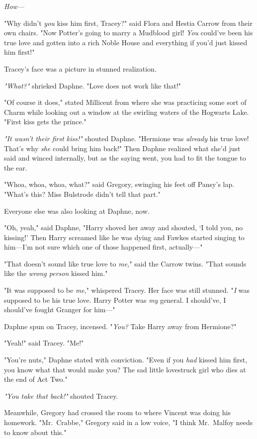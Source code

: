 \emph{How---}

"Why didn't \emph{you} kiss him first, Tracey?" said Flora and Hestia Carrow
from their own chairs. "Now Potter's going to marry a Mudblood girl! \emph{You}
could've been his true love and gotten into a rich Noble House and everything
if you'd just kissed him first!"

Tracey's face was a picture in stunned realization.

\emph{"What?"} shrieked Daphne. "Love does not work like that!"

"Of course it does," stated Millicent from where she was practicing some sort
of Charm while looking out a window at the swirling waters of the Hogwarts
Lake. "First kiss gets the prince."

\emph{"It wasn't their first kiss!"} shouted Daphne. "Hermione was
\emph{already} his true love! That's why \emph{she} could bring him back!" Then
Daphne realized what she'd just said and winced internally, but as the saying
went, you had to fit the tongue to the ear.

"Whoa, whoa, whoa, what?" said Gregory, swinging his feet off Pansy's lap.
"What's this? Miss Bulstrode didn't tell that part."

Everyone else was also looking at Daphne, now.

"Oh, yeah," said Daphne, "Harry shoved her away and shouted, `I told you, no
kissing!' Then Harry screamed like he was dying and Fawkes started singing to
him---I'm not sure which one of those happened first, actually\mbox{---}"

"That doesn't sound like true love to \emph{me,}" said the Carrow twins. "That
sounds like the \emph{wrong person} kissed him."

"It was supposed to be \emph{me}," whispered Tracey. Her face was still
stunned. "\emph{I} was supposed to be his true love. Harry Potter was \emph{my}
general. I should've, I should've fought Granger for him\mbox{---}"

Daphne spun on Tracey, incensed. "\emph{You?} Take Harry away from Hermione?"

"Yeah!" said Tracey. "Me!"

"You're nuts," Daphne stated with conviction. "Even if you \emph{had} kissed
him first, you know what that would make you? The sad little lovestruck girl
who dies at the end of Act Two."

\emph{"You take that back!"} shouted Tracey.

Meanwhile, Gregory had crossed the room to where Vincent was doing his
homework. "Mr.~Crabbe," Gregory said in a low voice, "I think Mr.~Malfoy needs
to know about this."
\sbreak
\vspace{-2\baselineskip}
